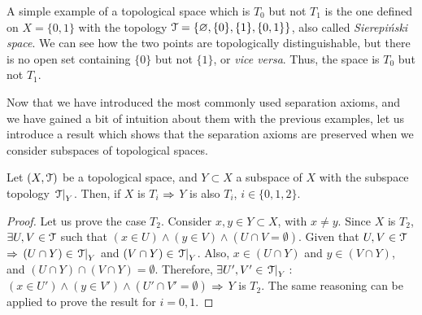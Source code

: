 \begin{example}
	A simple example of a topological space which is $T_0$ but not $T_1$ is the one defined on $X=\{0,1\}$ with the topology $\EuScript{T}=\{\varnothing, \{0\}, \{1\},\{0,1\}\}$, also called \emph{Sierepi\'{n}ski space}. We can see how the two points are topologically distinguishable, but there is no open set containing $\{0\}$ but not $\{1\}$, or \emph{vice versa}. Thus, the space is $T_0$ but not $T_1$.
\end{example}

Now that we have introduced the most commonly used separation axioms, and we have gained a bit of intuition about them with the previous examples, let us introduce a result which shows that the separation axioms are preserved when we consider subspaces of topological spaces.

\begin{theorem}
	\label{th:1-8}
	Let $(X, \EuScript{T})$ be a topological space, and $Y\subset X$ a subspace of $X$ with the subspace topology $\left.\EuScript{T}\right|_{Y}$.
	Then, if $X$ is $T_i$ $\Rightarrow$ $Y$ is also $T_i$, $i\in\{0,1,2\}$.
\end{theorem}
\begin{proof}
	Let us prove the case $T_2$.
	Consider $x,y\in Y\subset X$, with $x\neq y$.
	Since $X$ is $T_2$, $\exists U,V\in\EuScript{T}$ such that $(x\in U)\land (y\in V)\land (U\cap V=\emptyset)$.
	Given that $U,V\in\EuScript{T}$ $\Rightarrow$ $(U\cap Y)\in \left.\EuScript{T}\right|_{Y}$ and $(V\cap Y)\in \left.\EuScript{T}\right|_{Y}$.
	Also, $x\in (U\cap Y)$ and $y\in (V\cap Y)$, and $(U\cap Y)\cap (V\cap Y)=\emptyset$.
	Therefore, $\exists U', V'\in \left.\EuScript{T}\right|_{Y}$\,:\,$(x\in U')\land (y\in V')\land (U'\cap V'=\emptyset)$ $\Rightarrow$ $Y$ is $T_2$.
	The same reasoning can be applied to prove the result for $i=0,1$.
\end{proof}

